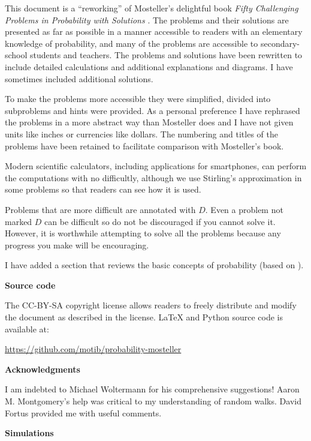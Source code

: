 This document is a ``reworking'' of Mosteller's delightful book \textit{Fifty Challenging Problems in Probability with Solutions} \cite{fifty}. The problems and their solutions are presented as far as possible in a manner accessible to readers with an elementary knowledge of probability, and many of the problems are accessible to secondary-school students and teachers. The problems and solutions have been rewritten to include detailed calculations and additional explanations and diagrams. I have sometimes included additional solutions.

To make the problems more accessible they were simplified, divided into subproblems and hints were provided. As a personal preference I have rephrased the problems in a more abstract way than Mosteller does and I have not given units like inches or currencies like dollars. The numbering and titles of the problems have been retained to facilitate comparison with Mosteller's book.

Modern scientific calculators, including applications for smartphones, can perform the computations with no difficultly, although we use Stirling's approximation in some problems so that readers can see how it is used.

Problems that are more difficult are annotated with $D$. Even a problem not marked $D$ can be difficult so do not be discouraged if you cannot solve it. However, it is worthwhile attempting to solve all the problems because any progress you make will be encouraging.

I have added a section that reviews the basic concepts of probability (based on \cite{ross}). 

\textbf{Source code}

The CC-BY-SA copyright license allows readers to freely distribute and modify the document as described in the license. \LaTeX{} and Python source code is available at:
\vspace*{-2ex}
\begin{center}
\url{https://github.com/motib/probability-mosteller}
\end{center}
\textbf{Acknowledgments}

I am indebted to Michael Woltermann for his comprehensive suggestions! Aaron M. Montgomery's help was critical to my understanding of random walks. David Fortus provided me with useful comments.

\newpage

\begin{center}
\textbf{\LARGE Simulations}
\end{center}

